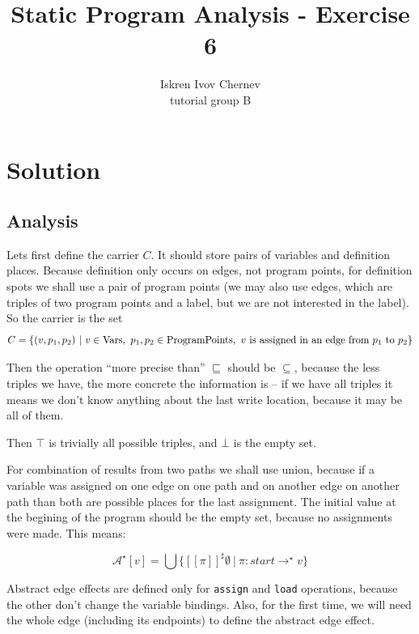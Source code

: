 \documentclass[a4paper]{article}
\begin{document}
\newcommand{\aee}[1] {[[#1]]^\sharp}
\newcommand{\cc}[1] {\texttt{#1}}
\def\A {\mathcal{A}}
\def\N {\mathcal{N}}
\def\Neg {\mathrm{Neg}}
\def\Pos {\mathrm{Pos}}
\def\Vars {\mathrm{Vars}}
\def\Occ {\mathrm{Occ}}
\def\PP {\mathrm{ProgramPoints}}

\title{Static Program Analysis - Exercise 6}
\author{Iskren Ivov Chernev \\ tutorial group B}

\maketitle

\section{Solution}

\subsection*{Analysis}

Lets first define the carrier $ C $. It should store pairs of variables and
definition places. Because definition only occurs on edges, not program points,
for definition spots we shall use a pair of program points (we may also use
edges, which are triples of two program points and a label, but we are not
interested in the label). So the carrier is the set
$$
  C = \{(v, p_1, p_2)\ |\ v \in \Vars,\ p_1, p_2 \in \PP,\ \text{$ v $ is
  assigned in an edge from $ p_1 $ to $ p_2 $} \}
$$

Then the operation ``more precise than'' $ \sqsubseteq $ should be $ \subseteq
$, because the less triples we have, the more concrete the information is -- if
we have all triples it means we don't know anything about the last write
location, because it may be all of them.

Then $ \top $ is trivially all possible triples, and $ \bot $ is the empty set.

For combination of results from two paths we shall use union, because if
a variable was assigned on one edge on one path and on another edge on another
path than both are possible places for the last assignment. The initial value
at the begining of the program should be the empty set, because no assignments
were made. This means:

$$
  \A^\star[v] = \bigcup \{ \aee{\pi}\emptyset \ |\ \pi : start \longrightarrow^\star v \}
$$

Abstract edge effects are defined only for \texttt{assign} and \texttt{load}
operations, because the other don't change the variable bindings. Also, for the
first time, we will need the whole edge (including its endpoints) to define the
abstract edge effect.
\end{document}
